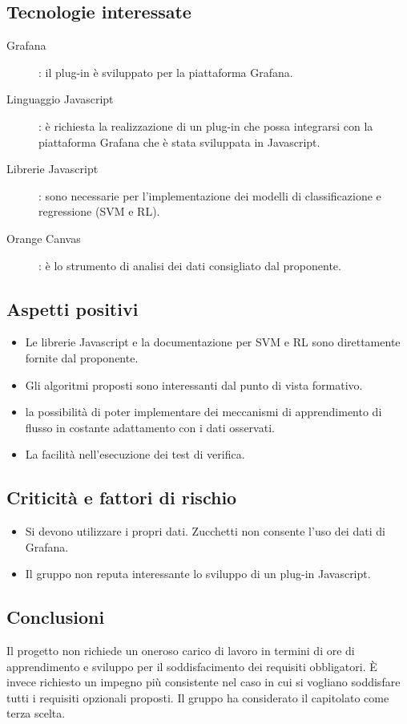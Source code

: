 \documentclass[../studio-di-fattibilita.tex]{subfiles}
\begin{document}
	\subsection{Tecnologie interessate}
	\label{sec:tecnologie_interessate}
	\begin{description}
		\item [Grafana]: il plug-in è sviluppato per la piattaforma Grafana.
		\item[Linguaggio Javascript]: è richiesta la realizzazione di un plug-in che possa integrarsi con la piattaforma Grafana che è stata sviluppata in Javascript.
		\item[Librerie Javascript]: sono necessarie per l'implementazione dei modelli di classificazione e regressione (SVM e RL).
		\item[Orange Canvas]: è lo strumento di analisi dei dati consigliato dal proponente.
	\end{description}
	\subsection{Aspetti positivi}
	\label{sec:aspetti_positivi}
	\begin{itemize}
		\item Le librerie Javascript e la documentazione per SVM e RL sono direttamente fornite dal proponente.
		\item Gli algoritmi proposti sono interessanti dal punto di vista formativo.
		\item la possibilità di poter implementare dei meccanismi di apprendimento di flusso in costante adattamento con i dati osservati.
		\item La facilità nell'esecuzione dei test di verifica.
	\end{itemize}
	\subsection{Criticità e fattori di rischio}
	\label{sec:criticita_e_fattori_di_rischio}
	\begin{itemize}
		\item Si devono utilizzare i propri dati. Zucchetti non consente l'uso dei dati di Grafana.
		\item Il gruppo non reputa interessante lo sviluppo di un plug-in Javascript.
	\end{itemize}
	\subsection{Conclusioni}
	\label{sec:conclusioni}
	Il progetto non richiede un oneroso carico di lavoro in termini di ore di apprendimento e sviluppo per il soddisfacimento dei requisiti obbligatori. È invece richiesto un impegno più consistente nel caso in cui si vogliano soddisfare tutti i requisiti opzionali proposti. Il gruppo ha considerato il capitolato come terza scelta.
	
\end{document}
